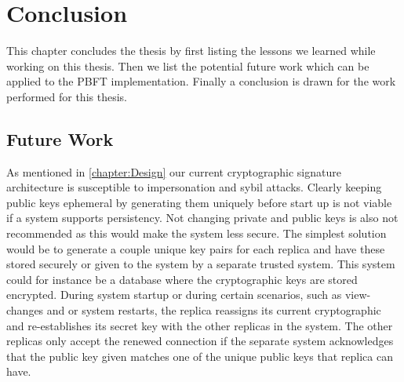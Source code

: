 \chapter{Conclusion}
\label{chapter:Con}
This chapter concludes the thesis by first listing the lessons we learned while working on this thesis. Then we list the potential future work which can be applied to the PBFT implementation.
Finally a conclusion is drawn for the work performed for this thesis.



\section{Future Work}

As mentioned in \autoref{chapter:Design} our current cryptographic signature architecture is susceptible to impersonation and sybil attacks. Clearly keeping public keys ephemeral by generating them uniquely before start up is not viable if a system supports persistency. Not changing private and public keys is also not recommended as this would make the system less secure. The simplest solution would be to generate a couple unique key pairs for each replica and have these stored securely or given to the system by a separate trusted system. This system could for instance be a database where the cryptographic keys are stored encrypted. During system startup or during certain scenarios, such as view-changes and or system restarts, the replica reassigns its current cryptographic and re-establishes its secret key with the other replicas in the system. The other replicas only accept the renewed connection if the separate system acknowledges that the public key given matches one of the unique public keys that replica can have.

